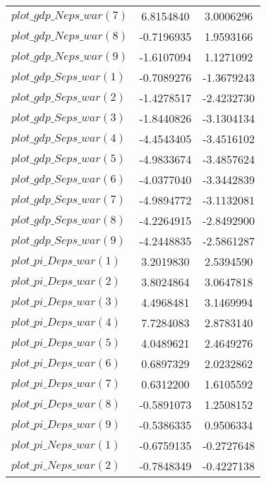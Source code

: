 \begin{center}
\begin{longtable}{lcc}
$plot\_gdp\_N eps\_war (7)  $	 & 	      6.8154840	 & 	      3.0006296 \\ 
$plot\_gdp\_N eps\_war (8)  $	 & 	     -0.7196935	 & 	      1.9593166 \\ 
$plot\_gdp\_N eps\_war (9)  $	 & 	     -1.6107094	 & 	      1.1271092 \\ 
$plot\_gdp\_S eps\_war (1)  $	 & 	     -0.7089276	 & 	     -1.3679243 \\ 
$plot\_gdp\_S eps\_war (2)  $	 & 	     -1.4278517	 & 	     -2.4232730 \\ 
$plot\_gdp\_S eps\_war (3)  $	 & 	     -1.8440826	 & 	     -3.1304134 \\ 
$plot\_gdp\_S eps\_war (4)  $	 & 	     -4.4543405	 & 	     -3.4516102 \\ 
$plot\_gdp\_S eps\_war (5)  $	 & 	     -4.9833674	 & 	     -3.4857624 \\ 
$plot\_gdp\_S eps\_war (6)  $	 & 	     -4.0377040	 & 	     -3.3442839 \\ 
$plot\_gdp\_S eps\_war (7)  $	 & 	     -4.9894772	 & 	     -3.1132081 \\ 
$plot\_gdp\_S eps\_war (8)  $	 & 	     -4.2264915	 & 	     -2.8492900 \\ 
$plot\_gdp\_S eps\_war (9)  $	 & 	     -4.2448835	 & 	     -2.5861287 \\ 
$plot\_pi\_D eps\_war (1)   $	 & 	      3.2019830	 & 	      2.5394590 \\ 
$plot\_pi\_D eps\_war (2)   $	 & 	      3.8024864	 & 	      3.0647818 \\ 
$plot\_pi\_D eps\_war (3)   $	 & 	      4.4968481	 & 	      3.1469994 \\ 
$plot\_pi\_D eps\_war (4)   $	 & 	      7.7284083	 & 	      2.8783140 \\ 
$plot\_pi\_D eps\_war (5)   $	 & 	      4.0489621	 & 	      2.4649276 \\ 
$plot\_pi\_D eps\_war (6)   $	 & 	      0.6897329	 & 	      2.0232862 \\ 
$plot\_pi\_D eps\_war (7)   $	 & 	      0.6312200	 & 	      1.6105592 \\ 
$plot\_pi\_D eps\_war (8)   $	 & 	     -0.5891073	 & 	      1.2508152 \\ 
$plot\_pi\_D eps\_war (9)   $	 & 	     -0.5386335	 & 	      0.9506334 \\ 
$plot\_pi\_N eps\_war (1)   $	 & 	     -0.6759135	 & 	     -0.2727648 \\ 
$plot\_pi\_N eps\_war (2)   $	 & 	     -0.7848349	 & 	     -0.4227138 \\ 

\end{longtable}
\end{center}

